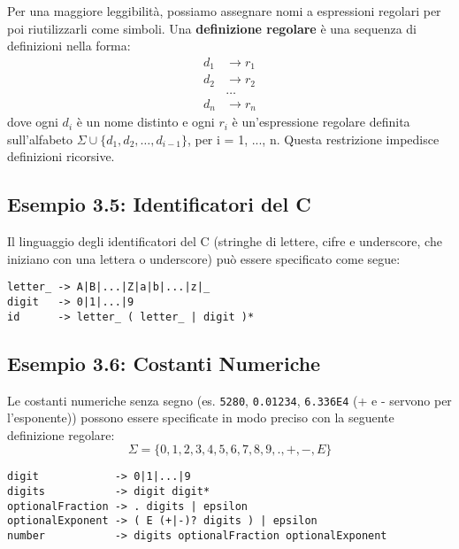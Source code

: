 \documentclass[a4paper, 11pt]{article}
\begin{document}
Per una maggiore leggibilità, possiamo assegnare nomi a espressioni regolari per poi riutilizzarli come simboli. Una \textbf{definizione regolare} è una sequenza di definizioni nella forma:
\begin{align*}
    d_1 & \rightarrow r_1 \\
    d_2 & \rightarrow r_2 \\
    & \dots \\
    d_n & \rightarrow r_n
\end{align*}
dove ogni $d_i$ è un nome distinto e ogni $r_i$ è un'espressione regolare definita sull'alfabeto $\Sigma \cup \{d_1, d_2, \dots, d_{i-1}\}$, per i = 1, ..., n. Questa restrizione impedisce definizioni ricorsive.

\subsection{Esempio 3.5: Identificatori del C}
Il linguaggio degli identificatori del C (stringhe di lettere, cifre e underscore, che iniziano con una lettera o underscore) può essere specificato come segue:
\begin{Verbatim}[frame=single]
letter_ -> A|B|...|Z|a|b|...|z|_
digit   -> 0|1|...|9
id      -> letter_ ( letter_ | digit )*
\end{Verbatim}

\subsection{Esempio 3.6: Costanti Numeriche}
Le costanti numeriche senza segno (es. \texttt{5280}, \texttt{0.01234}, \texttt{6.336E4} (+ e - servono per l’esponente)) possono essere specificate in modo preciso con la seguente definizione regolare:
\[ \Sigma = \{0, 1, 2, 3, 4, 5, 6, 7, 8, 9, ., +, -, E\} \]
\begin{Verbatim}[frame=single]
digit            -> 0|1|...|9
digits           -> digit digit*
optionalFraction -> . digits | epsilon
optionalExponent -> ( E (+|-)? digits ) | epsilon
number           -> digits optionalFraction optionalExponent
\end{Verbatim}
\end{document}
